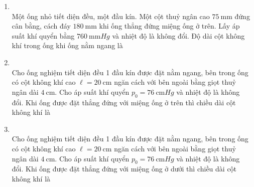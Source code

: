 \begin{enumerate}[label=\bfseries Câu \arabic*:, leftmargin=1.7cm]
\item {}\\
Một ống nhỏ tiết diện đều, một đầu kín. Một cột thuỷ ngân cao $\SI{75}{\milli\meter}$ đứng cân bằng, cách đáy $\SI{180}{\milli\meter}$ khi ống thẳng đứng miệng ống ở trên. Lấy áp suất khí quyển bằng $\SI{760}{\milli\meter Hg}$ và nhiệt độ là không đổi. Độ dài cột không khí trong ống khi ống nằm ngang là

\item {}\\
Cho ống nghiệm tiết diện đều 1 đầu kín được đặt nằm ngang, bên trong ống có cột không khí cao $\ell=\SI{20}{\centi\meter}$ ngăn cách với bên ngoài bằng giọt thuỷ ngân dài $\SI{4}{\centi\meter}$. Cho áp suất khí quyển $p_0=\SI{76}{\centi\meter Hg}$ và nhiệt độ là không đổi. Khi ống được đặt thẳng đứng với miệng ống ở trên thì chiều dài cột không khí là


\item {}\\
Cho ống nghiệm tiết diện đều 1 đầu kín được đặt nằm ngang, bên trong ống có cột không khí cao $\ell=\SI{20}{\centi\meter}$ ngăn cách với bên ngoài bằng giọt thuỷ ngân dài $\SI{4}{\centi\meter}$. Cho áp suất khí quyển $p_0=\SI{76}{\centi\meter Hg}$ và nhiệt độ là không đổi. Khi ống được đặt thẳng đứng với miệng ống ở dưới thì chiều dài cột không khí là


\end{enumerate}
